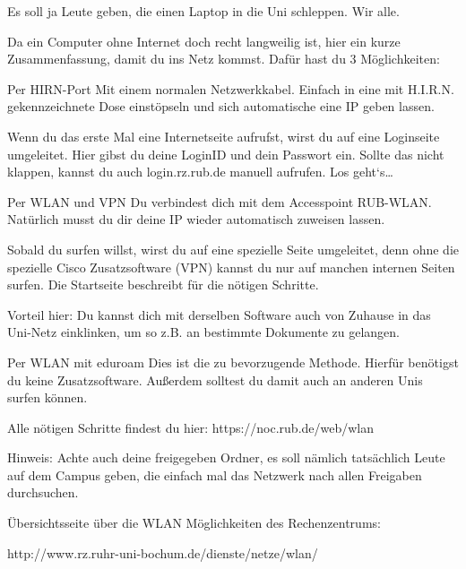 Es soll ja Leute geben, die einen Laptop in die Uni schleppen. Wir alle. 

Da ein Computer ohne Internet doch recht langweilig ist, hier ein kurze Zusammenfassung, damit du ins Netz kommst. Dafür hast du 3 Möglichkeiten:

Per HIRN-Port
Mit einem normalen Netzwerkkabel. Einfach in eine mit H.I.R.N. gekennzeichnete Dose einstöpseln und sich automatische eine IP geben lassen.

Wenn du das erste Mal eine Internetseite aufrufst, wirst du auf eine Loginseite umgeleitet. Hier gibst du deine LoginID und dein Passwort ein. Sollte das nicht klappen, kannst du auch login.rz.rub.de manuell aufrufen. Los geht‘s…

Per WLAN und VPN
Du verbindest dich mit dem Accesspoint RUB-WLAN. Natürlich musst du dir deine IP wieder automatisch zuweisen lassen.

Sobald du surfen willst, wirst du auf eine spezielle Seite umgeleitet, denn ohne die spezielle Cisco Zusatzsoftware (VPN) kannst du nur auf manchen internen Seiten surfen. Die Startseite beschreibt für die nötigen Schritte.

Vorteil hier: Du kannst dich mit derselben Software auch von Zuhause in das Uni-Netz einklinken, um so z.B. an bestimmte Dokumente zu gelangen.

Per WLAN mit eduroam
Dies ist die zu bevorzugende Methode. Hierfür benötigst du keine Zusatzsoftware. Außerdem solltest du damit auch an anderen Unis surfen können.

Alle nötigen Schritte findest du hier:
https://noc.rub.de/web/wlan

Hinweis:
Achte auch deine freigegeben Ordner, es soll nämlich tatsächlich Leute auf dem Campus geben, die einfach mal das Netzwerk nach allen Freigaben durchsuchen.

Übersichtsseite über die WLAN Möglichkeiten des Rechenzentrums:

http://www.rz.ruhr-uni-bochum.de/dienste/netze/wlan/
